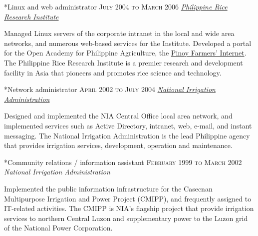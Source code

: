 \documentclass[10pt, a4paper, final]{article}
\begin{document}
\begin{minipage}[t]{0.65\linewidth}
\begin{section}
    \begin{subsection}*{Linux and web administrator \hfill\textsc{July 2004 to March 2006}}
      \href{http://www.philrice.gov.ph}{\textit{Philippine Rice Research Institute}} 

      Managed Linux servers of the corporate intranet in the local and wide area networks, and numerous web-based services for the Institute. Developed a portal for the Open Academy for Philippine Agriculture, the \href{http://www.openacademy.ph}{Pinoy Farmers' Internet}. The Philippine Rice Research Institute is a premier research and development facility in Asia that pioneers and promotes rice science and technology.
    \end{subsection}
    \vspace{1em}
  
    \begin{subsection}*{Network administrator \hfill\textsc{April 2002 to July 2004}}
      \href{http://www.nia.gov.ph}{\textit{National Irrigation Administration}} 

      Designed and implemented the NIA Central Office local area network, and implemented services such as Active Directory, intranet, web, e-mail, and instant messaging. The National Irrigation Administration is the lead Philippine agency that provides irrigation services, development, operation and maintenance.
    \end{subsection}
    \vspace{1em}
  
    \begin{subsection}*{Community relations / information assistant \hfill\textsc{February 1999 to March 2002}}
      \textit{National Irrigation Administration}

      Implemented the public information infrastructure for the Casecnan Multipurpose Irrigation and Power Project (CMIPP), and frequently assigned to IT-related activities. The CMIPP is NIA's flagship project that provide irrigation services to northern Central Luzon and supplementary power to the Luzon grid of the National Power Corporation.
    \end{subsection}
    \vspace{1em}
  \end{section}
\end{minipage}
\end{document}
